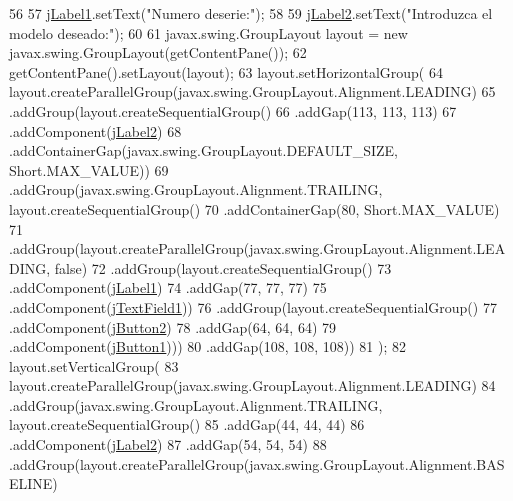 \begin{DoxyCode}
56 
57         \mbox{\hyperlink{class_interfaz_package_1_1_comprar_lector_a7e62e32a7c3e71321d44cc91402fa5d2}{jLabel1}}.setText(\textcolor{stringliteral}{"Numero deserie:"});
58 
59         \mbox{\hyperlink{class_interfaz_package_1_1_comprar_lector_aa53b79d81e5b7d3b02915635e09c9242}{jLabel2}}.setText(\textcolor{stringliteral}{"Introduzca el modelo deseado:"});
60 
61         javax.swing.GroupLayout layout = \textcolor{keyword}{new} javax.swing.GroupLayout(getContentPane());
62         getContentPane().setLayout(layout);
63         layout.setHorizontalGroup(
64             layout.createParallelGroup(javax.swing.GroupLayout.Alignment.LEADING)
65             .addGroup(layout.createSequentialGroup()
66                 .addGap(113, 113, 113)
67                 .addComponent(\mbox{\hyperlink{class_interfaz_package_1_1_comprar_lector_aa53b79d81e5b7d3b02915635e09c9242}{jLabel2}})
68                 .addContainerGap(javax.swing.GroupLayout.DEFAULT\_SIZE, Short.MAX\_VALUE))
69             .addGroup(javax.swing.GroupLayout.Alignment.TRAILING, layout.createSequentialGroup()
70                 .addContainerGap(80, Short.MAX\_VALUE)
71                 .addGroup(layout.createParallelGroup(javax.swing.GroupLayout.Alignment.LEADING, \textcolor{keyword}{false})
72                     .addGroup(layout.createSequentialGroup()
73                         .addComponent(\mbox{\hyperlink{class_interfaz_package_1_1_comprar_lector_a7e62e32a7c3e71321d44cc91402fa5d2}{jLabel1}})
74                         .addGap(77, 77, 77)
75                         .addComponent(\mbox{\hyperlink{class_interfaz_package_1_1_comprar_lector_abba4b0576e701088c0c1389d7e28aaa9}{jTextField1}}))
76                     .addGroup(layout.createSequentialGroup()
77                         .addComponent(\mbox{\hyperlink{class_interfaz_package_1_1_comprar_lector_abb0ea1df40ce44e8356e98fe9824d075}{jButton2}})
78                         .addGap(64, 64, 64)
79                         .addComponent(\mbox{\hyperlink{class_interfaz_package_1_1_comprar_lector_a13cefaf762557d197990543e13a3bc59}{jButton1}})))
80                 .addGap(108, 108, 108))
81         );
82         layout.setVerticalGroup(
83             layout.createParallelGroup(javax.swing.GroupLayout.Alignment.LEADING)
84             .addGroup(javax.swing.GroupLayout.Alignment.TRAILING, layout.createSequentialGroup()
85                 .addGap(44, 44, 44)
86                 .addComponent(\mbox{\hyperlink{class_interfaz_package_1_1_comprar_lector_aa53b79d81e5b7d3b02915635e09c9242}{jLabel2}})
87                 .addGap(54, 54, 54)
88                 .addGroup(layout.createParallelGroup(javax.swing.GroupLayout.Alignment.BASELINE)

\end{DoxyCode}
